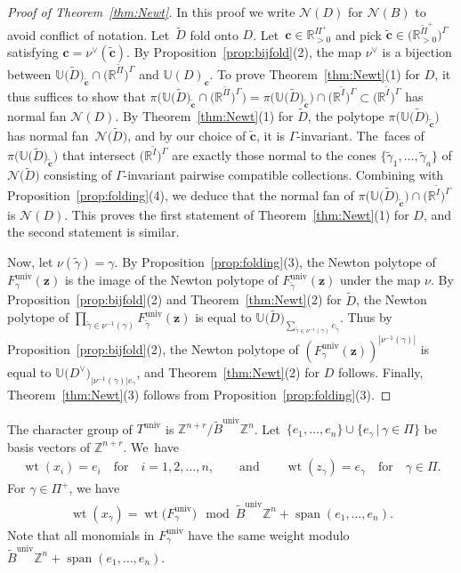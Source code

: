 \documentclass[pdftex]{sigma}%
\def\R{{\mathbb R}}
\def\Z{{\mathbb Z}}
\def\univ{{\operatorname{univ}}}
\def\tB{{\tilde B}}
\def\sp{\operatorname{span}}
\def\wt{\operatorname{wt}}
\def\U{{\mathbb U}}
\def\tD{{\tilde D}}
\def\tB{{\tilde B}}
\def\tc{{\tilde \c}}
\def\tI{{\tilde I}}
\def\z{{\mathbf z}}
\def\N{{\mathcal{N}}}
\def\tgamma{{\tilde \gamma}}
\def\tPi{{\tilde \Pi}}
\def\c{{\mathbf c}}
\numberwithin{equation}{section}
\begin{document}
\begin{proof}[Proof of Theorem~\ref{thm:Newt}]
In this proof we write $\N(D)$ for $\N(B)$ to avoid conflict of notation. Let~$\tD$ fold onto $D$. Let~$\c \in \R_{>0}^{\Pi^+}$ and pick $\tc \in \big(\R_{>0}^{\tPi^+}\big)^\Gamma$ satisfying $\c = \nu^\vee(\tc)$. By Proposition~\ref{prop:bijfold}(2), the map $\nu^\vee$ is a bijection between $\U\big(\tD\big)_{\tc} \cap \big(\R^{\tPi}\big)^\Gamma$ and $\U(D)_{\c}$. To prove Theorem~\ref{thm:Newt}(1) for $D$, it thus suffices to show that $\pi\big(\U\big(\tD\big)_{\tc} \cap \big(\R^{\tPi}\big)^\Gamma\big) = \pi\big(\U\big(\tD\big)_{\tc}\big) \cap \big(\R^{\tI}\big)^\Gamma \subset \big(\R^{\tI}\big)^\Gamma$ has normal fan $\N(D)$.
By Theorem~\ref{thm:Newt}(1) for $\tD$, the polytope $\pi\big(\U\big(\tD\big)_{\tc}\big)$ has normal fan~$\N\big(\tD\big)$, and by our choice of $\tc$, it is $\Gamma$-invariant. The~faces of $\pi\big(\U\big(\tD\big)_{\tc}\big)$ that intersect $\big(\R^{\tI}\big)^\Gamma$ are exactly those normal to the cones $\{\tgamma_1,\dots,\tgamma_a\}$ of $\N\big(\tD\big)$ consisting of $\Gamma$-invariant pairwise compatible collections. Combining with Proposition~\ref{prop:folding}(4), we deduce that the normal fan of $\pi\big(\U\big(\tD\big)_{\tc}\big) \cap \big(\R^{\tI}\big)^\Gamma$ is $\N(D)$. This proves the first statement of Theorem~\ref{thm:Newt}(1) for $D$, and the second statement is similar.

Now, let $\nu(\tgamma) = \gamma$. By Proposition~\ref{prop:folding}(3), the Newton polytope of $F_\gamma^\univ(\z)$ is the image of the Newton polytope of $F_\tgamma^\univ(\z)$ under the map $\nu$. By Proposition~\ref{prop:bijfold}(2) and Theorem~\ref{thm:Newt}(2) for $\tD$, the Newton polytope of $\prod_{\tgamma \in \nu^{-1}(\gamma)} F_\tgamma^\univ(\z)$ is equal to $\U\big(\tD\big)_{\sum_{\tgamma \in \nu^{-1}(\gamma)} e_{\tgamma}}$. Thus by Proposition~\ref{prop:bijfold}(2), the Newton polytope of $(F_\gamma^\univ(\z))^{|\nu^{-1}(\gamma)|}$ is equal to $\U\big(D^\vee\big)_{|\nu^{-1}(\gamma)| e_{\gamma}}$, and Theorem~\ref{thm:Newt}(2) for $D$ follows. Finally, Theorem~\ref{thm:Newt}(3) follows from Proposition~\ref{prop:folding}(3).
\end{proof}

\bigskip{}
The character group of $T^\univ$ is $\Z^{n+r}/\tB^\univ \Z^n$. Let~$\{e_1,\dots,e_n\} \cup \{e_\gamma \,|\, \gamma \in \Pi\}$ be basis vectors of $\Z^{n+r}$. We~have
\begin{gather}\label{eq:wtuniv}
\wt(x_i) = e_i\quad \text{for}\quad i = 1,2,\dots,n, \qquad \text{and} \qquad
\wt(z_\gamma) = e_\gamma\quad \text{for}\quad \gamma \in \Pi.
\end{gather}
For $\gamma \in \Pi^+$, we have
\begin{gather*}
\wt(x_\gamma) = \wt\big(F^\univ_\gamma\big) \mod \tB^\univ \Z^n + \sp({e_1,\dots,e_n}).
\end{gather*}
Note that all monomials in $F^\univ_\gamma$ have the same weight modulo $\tB^\univ \Z^n + \sp({e_1,\dots,e_n})$.
\end{document}

